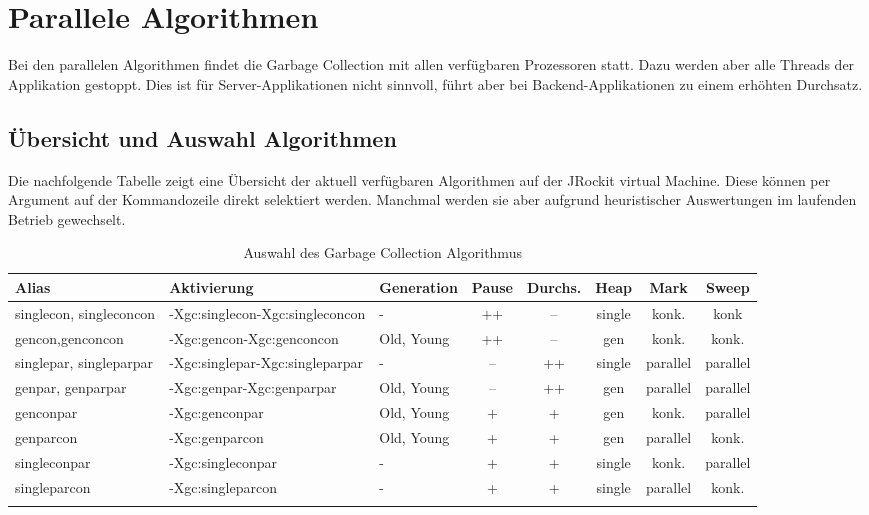 \section{Parallele Algorithmen}
Bei den parallelen Algorithmen findet die Garbage Collection mit allen verfügbaren Prozessoren statt. Dazu werden aber alle Threads der Applikation gestoppt. Dies ist für Server-Applikationen nicht sinnvoll, führt aber bei Backend-Applikationen zu einem erhöhten Durchsatz.

\subsection{Übersicht und Auswahl Algorithmen}\label{auswahl_algorithmen}
Die nachfolgende Tabelle zeigt eine Übersicht der aktuell verfügbaren Algorithmen auf der JRockit virtual Machine. Diese können per Argument auf der Kommandozeile direkt selektiert werden. Manchmal werden sie aber aufgrund heuristischer Auswertungen im laufenden Betrieb gewechselt.
  \begin{longtable}{|p{2cm}|p{2.8cm}|l|c|c|c|c|c|}
    \hline
  \textbf{Alias} & \textbf{Aktivierung}& \textbf{Generation} & \textbf{Pause} &\textbf{Durchs.} & \textbf{Heap} & \textbf{Mark} & \textbf{Sweep} \\\hline
  singlecon, singleconcon & -Xgc:singlecon\newline-Xgc:singleconcon& - &++&--& single & konk. & konk\\\hline

  gencon,\newline genconcon& -Xgc:gencon\newline-Xgc:genconcon &Old, Young&++&-- & gen & konk. & konk.\\\hline	
 
  singlepar, \newline singleparpar& -Xgc:singlepar\newline-Xgc:singleparpar & - & -- & ++ & single & parallel & parallel \\\hline
  genpar, \newline genparpar& -Xgc:genpar\newline-Xgc:genparpar & Old, Young & -- & ++ & gen& parallel & parallel \\\hline
  genconpar &-Xgc:genconpar&Old, Young&+&+&gen& konk. & parallel \\\hline
  genparcon &-Xgc:genparcon&Old, Young&+&+&gen& parallel & konk. \\\hline
  singleconpar &-Xgc:singleconpar&-&+&+&single&konk. & parallel \\\hline
  singleparcon& -Xgc:singleparcon&-&+&+&single&parallel & konk. \\\hline
\caption{Auswahl des Garbage Collection Algorithmus}
  \end{longtable}

